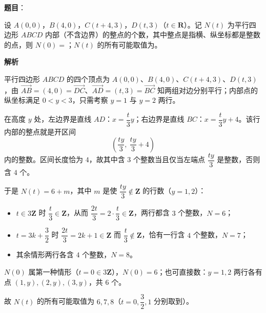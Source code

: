 \begin{answer}

\textbf{题目}：

设 $A(0,0)$，$B(4,0)$，$C(t+4,3)$，$D(t,3)$（$t\in\mathbf R$）。记 $N(t)$ 为平行四边形 $ABCD$ 内部（不含边界）的整点的个数，其中整点是指横、纵坐标都是整数的点，则 $N(0)=$\gkblank{}；$N(t)$ 的所有可能取值为\gkblank{}。

\textbf{解析}

平行四边形 $ABCD$ 的四个顶点为 $A(0,0)$、$B(4,0)$、$C(t+4,3)$、$D(t,3)$，由 $\overrightarrow{AB}=(4,0)=\overrightarrow{DC}$、$\overrightarrow{AD}=(t,3)=\overrightarrow{BC}$ 知两组对边分别平行；内部点的纵坐标满足 $0<y<3$，只需考察 $y=1$ 与 $y=2$ 两行。

在高度 $y$ 处，左边界是直线 $AD$：$x=\dfrac t3y$；右边界是直线 $BC$：$x=\dfrac t3y+4$。该行内部的整点就是开区间
\nopagebreak[4]
\[
\left(\frac{ty}{3},\ \frac{ty}{3}+4\right)
\]
内的整数。区间长度恰为 $4$，故其中含 $3$ 个整数当且仅当左端点 $\dfrac{ty}{3}$ 是整数，否则含 $4$ 个。

于是 $N(t)=6+m$，其中 $m$ 是使 $\dfrac{ty}{3}\notin\mathbf Z$ 的行数（$y=1,2$）：

\begin{itemize}
\item $t\in3\mathbf Z$ 时 $\dfrac t3\in\mathbf Z$，从而 $\dfrac{2t}{3}=2\cdot\dfrac t3\in\mathbf Z$，两行都含 $3$ 个整数，$N=6$；
\item $t=3k+\dfrac32$ 时 $\dfrac{2t}{3}=2k+1\in\mathbf Z$ 而 $\dfrac t3\notin\mathbf Z$，恰有一行含 $4$ 个整数，$N=7$；
\item 其余情形两行各含 $4$ 个整数，$N=8$。
\end{itemize}

$N(0)$ 属第一种情形（$t=0\in3\mathbf Z$），$N(0)=6$；也可直接数：$y=1,2$ 两行各有点 $(1,y),(2,y),(3,y)$，共 $6$ 个。

故 $N(t)$ 的所有可能取值为 $6,7,8$（$t=0,\dfrac32,1$ 分别取到）。


\end{answer}
